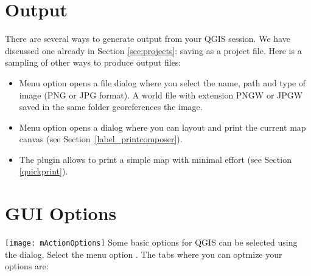 \section{Output}\label{sec:output}

There are several ways to generate output from your QGIS session. We have
discussed one already in Section \ref{sec:projects}: saving as a project file.
Here is a sampling of other ways to produce output files:

\begin{itemize}
\item Menu option  opens
a file dialog where you select the name, path and type of image (PNG or JPG
format). A world file with extension PNGW or JPGW saved in the same folder
georeferences the image.
\item Menu option  opens a
dialog where you can layout and print the current map canvas (see
Section~\ref{label_printcomposer}).
\item The  plugin allows
to print a simple map with minimal effort (see Section \ref{quickprint}).
\end{itemize}

\section{GUI Options}\label{subsec:gui_options}

\texttt{[image: mActionOptions]} Some basic options
for QGIS can be selected using the  dialog. Select the
menu option  \arrow
{}. The tabs where you can
optmize your options are:



